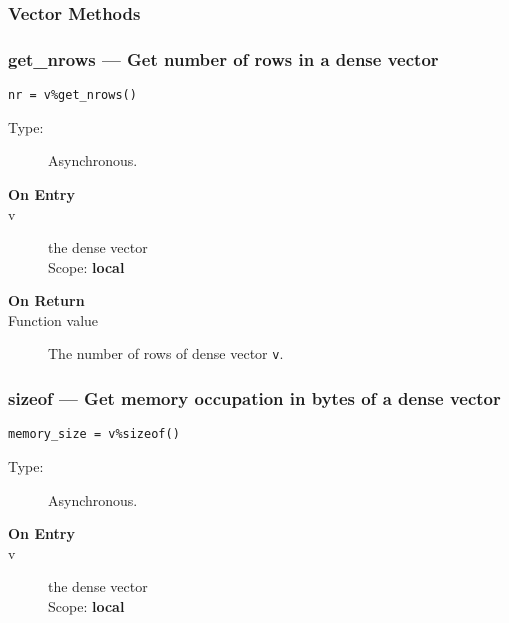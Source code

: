 \subsubsection{Vector Methods}
\subsubsection{get\_nrows --- Get number of  rows in a dense vector}

\begin{verbatim}
nr = v%get_nrows()
\end{verbatim}

\begin{description}
\item[Type:] Asynchronous.
\item[\bf On Entry]
\item[v] the dense vector\\
Scope: {\bf local}\\
\end{description}

\begin{description}
\item[\bf On Return]
\item[Function value] The number of  rows  of dense vector \verb|v|.
\end{description}


\subsubsection{sizeof  --- Get memory occupation in bytes
of  a dense vector}

\begin{verbatim}
memory_size = v%sizeof()
\end{verbatim}

\begin{description}
\item[Type:] Asynchronous.
\item[\bf On Entry]
\item[v] the dense vector\\
Scope: {\bf local}\\
\end{description}

